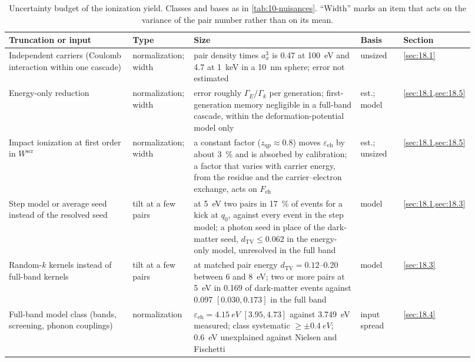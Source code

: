 \begin{table}[tbp]
  \caption{Uncertainty budget of the ionization yield. Classes and bases as in \cref{tab:10-nuisances}. ``Width'' marks an item that acts on the variance of the pair number rather than on its mean.}
  \label{tab:18-nuisances}
  \centering\scriptsize\setlength{\tabcolsep}{3pt}
  \begin{tabular}{@{}>{\raggedright\arraybackslash}p{0.26\linewidth}>{\raggedright\arraybackslash}p{0.12\linewidth}>{\raggedright\arraybackslash}p{0.35\linewidth}>{\raggedright\arraybackslash}p{0.09\linewidth}>{\raggedright\arraybackslash}p{0.10\linewidth}@{}}
    \toprule
    Truncation or input & Type & Size & Basis & Section \\
    \midrule
    Independent carriers (Coulomb interaction within one cascade) & normali\-zation; width & pair density times $a_x^3$ is 0.47 at \SI{100}{eV} and 4.7 at \SI{1}{keV} in a \SI{10}{nm} sphere; error not estimated & unsized & \cref{sec:18.1} \\
    Energy-only reduction & normali\-zation; width & error roughly $\varGamma_E/\varGamma_k$ per generation; first-generation memory negligible in a full-band cascade, within the deformation-potential model only & est.; model & \cref{sec:18.1,sec:18.5} \\
    Impact ionization at first order in $W^{\mathrm{scr}}$ & normali\-zation; width & a constant factor ($z_{\mathrm{qp}} \approx 0.8$) moves $\varepsilon_{\mathrm{eh}}$ by about \SI{3}{\percent} and is absorbed by calibration; a factor that varies with carrier energy, from the residue and the carrier--electron exchange, acts on $F_{\mathrm{eh}}$ & est.; unsized & \cref{sec:18.1,sec:18.5} \\
    Step model or average seed instead of the resolved seed & tilt at a few pairs & at \SI{5}{eV} two pairs in \SI{17}{\percent} of events for a kick at $q_0$, against every event in the step model; a photon seed in place of the dark-matter seed, $d_{\mathrm{TV}} \le 0.062$ in the energy-only model, unresolved in the full band & model & \cref{sec:18.1,sec:18.3} \\
    Random-$k$ kernels instead of full-band kernels & tilt at a few pairs & at matched pair energy $d_{\mathrm{TV}} = 0.12$--0.20 between 6 and \SI{8}{eV}; two or more pairs at \SI{5}{eV} in 0.169 of dark-matter events against 0.097 $[0.030, 0.173]$ in the full band & model & \cref{sec:18.3} \\
    Full-band model class (bands, screening, phonon couplings) & normali\-zation & $\varepsilon_{\mathrm{eh}} = \SI{4.15}{eV}$ $[3.95, 4.73]$ against \SI{3.749}{eV} measured; class systematic $\ge \pm\SI{0.4}{eV}$; \SI{0.6}{eV} unexplained against Nielsen and Fischetti & input spread & \cref{sec:18.4} \\

\end{tabular}
\end{table}
